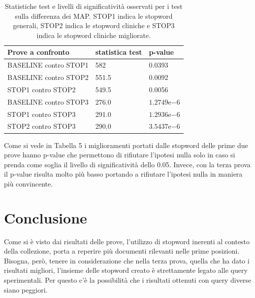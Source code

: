 \documentclass[runningheads]{llncs}
\begin{document}
\begin{table}
\centering
\begin{tabular}{lll}
\hline
\textbf{ Prove a confronto }  & \textbf{ statistica test }  & \textbf{ p-value }            \\ \hline
 BASELINE contro STOP1  &  582      &  0.0393       \\
 BASELINE contro STOP2  &  551.5    &  0.0092       \\
 STOP1 contro STOP2     &  549.5    &  0.0056       \\
 BASELINE contro STOP3  &  276.0    &  $1.2749\mathrm{e}{-6}$   \\
 STOP1 contro STOP3     &  291.0    &  $1.2936\mathrm{e}{-6}$   \\
 STOP2 contro STOP3     &  290.0    &  $3.5437\mathrm{e}{-6}$   \\ \hline
\end{tabular}

\caption{ Statistiche test e livelli di significativit\`a osservati per i test sulla differenza dei MAP.
STOP1 indica le stopword generali, STOP2 indica le stopword cliniche e STOP3 indica le stopword cliniche migliorate.}
\end{table}

Come si vede in Tabella 5 i miglioramenti portati dalle stopword delle prime due prove hanno p-value che permettono di rifiutare l'ipotesi nulla solo in caso si prenda come soglia il livello di significativit\`a dello 0.05.
Invece, con la terza prova il p-value risulta molto pi\`u basso portando a rifiutare l'ipotesi nulla in maniera pi\`u convincente.


\section{Conclusione}

Come si \`e visto dai risultati delle prove, l'utilizzo di stopword inerenti al contesto
della collezione, porta a reperire pi\`u documenti rilevanti nelle prime posizioni.
Bisogna, per\`o, tenere in considerazione che nella terza prova, quella che ha dato
i risultati migliori, l'insieme delle stopword creato \`e strettamente legato alle
query sperimentali. Per questo c'\`e la possibilit\`a che i risultati ottenuti con query diverse
siano peggiori.


%
\end{document}
